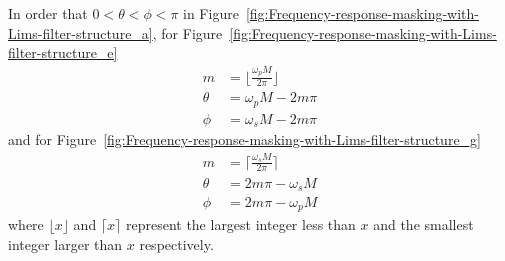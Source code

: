 \documentclass[a4paper,twoside,10pt,english]{report}
\begin{document}
In order that $0<\theta<\phi<\pi$ in 
Figure~\ref{fig:Frequency-response-masking-with-Lims-filter-structure_a},
for Figure~\ref{fig:Frequency-response-masking-with-Lims-filter-structure_e}
\begin{align*}
m &= \lfloor\frac{\omega_{p}M}{2\pi}\rfloor\\
\theta &= \omega_{p}M-2m\pi\\
\phi &= \omega_{s}M-2m\pi
\end{align*}
and for Figure~\ref{fig:Frequency-response-masking-with-Lims-filter-structure_g}
\begin{align*}
m &= \lceil\frac{\omega_{s}M}{2\pi}\rceil\\
\theta &= 2m\pi-\omega_{s}M\\
\phi &= 2m\pi-\omega_{p}M
\end{align*}
where $\lfloor x \rfloor$ and $\lceil x \rceil$ represent the largest integer
less than $x$ and the smallest integer larger than $x$ respectively.
\clearpage
\end{document}
